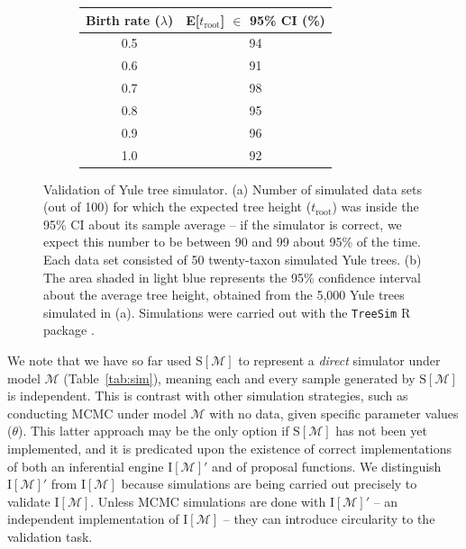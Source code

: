 \documentclass[oneside]{article}
\begin{document}
\begin{figure}
  \centering
  \vspace{0pt}
  \begin{subfigure}[t]{0.5\textwidth}
    \caption{}
    \centering
    \begin{tabular}{ c|c }
    \hline
    Birth rate ($\lambda$) & E[$t_{\text{root}}$] $\in$ 95\% CI (\%)\\
    \hline  
    0.5 & 94\\
    0.6 & 91\\
    0.7 & 98\\
    0.8 & 95\\
    0.9 & 96\\
    1.0 & 92\\
    \hline
  \end{tabular}
  \end{subfigure}
  \vspace{0pt}
  \hspace{1cm}
  \begin{subfigure}[t]{0.4\textwidth}
    \caption{}
    \centering
        
  \end{subfigure}
  \hfill
  \caption{Validation of Yule tree simulator.
    (a) Number of simulated data sets (out of 100) for which the
    expected tree height ($t_{\text{root}}$) was inside the 95\% CI
    about its sample average -- if the simulator is correct, we expect
    this number to be between 90 and 99 about 95\% of the time.
    Each data set consisted of 50 twenty-taxon simulated Yule trees.
    (b) The area shaded in light blue represents the
    95\% confidence interval about the average tree height, obtained
    from the 5,000 Yule trees simulated in (a). Simulations were
    carried out with the \texttt{TreeSim} R package \citep{stadler11}.}
  \label{fig:yulemean}
\end{figure}

We note that we have so far used $\text{S}[\mathcal{M}]$ to represent a \emph{direct} simulator under model $\mathcal{M}$ (Table~\ref{tab:sim}), meaning each and every sample generated by $\text{S}[\mathcal{M}]$ is independent.
This is contrast with other simulation strategies, such as conducting MCMC under model $\mathcal{M}$ with no data, given specific parameter values ($\theta$).
This latter approach may be the only option if $\text{S}[\mathcal{M}]$ has not been yet implemented, and it is predicated upon the existence of correct implementations of both an inferential engine $\text{I}[\mathcal{M}]'$ and of proposal functions.
We distinguish $\text{I}[\mathcal{M}]'$ from $\text{I}[\mathcal{M}]$ because simulations are being carried out precisely to validate $\text{I}[\mathcal{M}]$.
Unless MCMC simulations are done with $\text{I}[\mathcal{M}]'$ -- an independent implementation of $\text{I}[\mathcal{M}]$ -- they can introduce circularity to the validation task.
\end{document}
